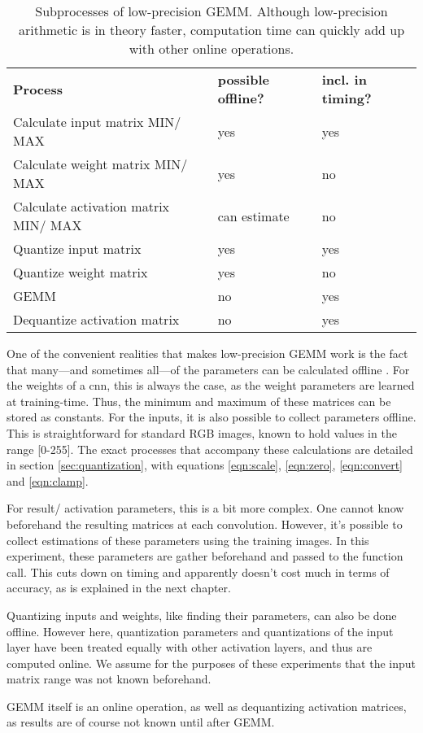 \begin{table}[]
\centering
\caption[Low-precision GEMM broken down by process]{Subprocesses of low-precision GEMM. Although low-precision arithmetic is in theory faster, computation time can quickly add up with other online operations.}
\label{tbl:gemmlowp}
\begin{tabular}{lll}
\textbf{Process}                                       & \textbf{possible offline?} & \textbf{incl. in timing?} \\
Calculate input matrix MIN/ MAX     & yes                        & yes                       \\
Calculate weight matrix MIN/ MAX     & yes                        & no                        \\
Calculate activation matrix MIN/ MAX & can estimate               & no                        \\
Quantize input matrix                & yes                        & yes                       \\
Quantize weight matrix               & yes                        & no                        \\
GEMM                                 & no                         & yes                       \\
Dequantize activation matrix         & no                         & yes                      
\end{tabular}
\end{table}

One of the convenient realities that makes low-precision GEMM work is the fact that many---and sometimes all---of the parameters can be calculated offline \cite{warden_quantize}. For the weights of a cnn, this is always the case, as the weight parameters are learned at training-time. Thus, the minimum and maximum of these matrices can be stored as constants. For the inputs, it is also possible to collect parameters offline. This is straightforward for standard RGB images, known to hold values in the range [0-255]. The exact processes that accompany these calculations are detailed in section \ref{sec:quantization}, with equations \ref{eqn:scale}, \ref{eqn:zero}, \ref{eqn:convert} and \ref{eqn:clamp}.

For result/ activation parameters, this is a bit more complex. One cannot know beforehand the resulting matrices at each convolution. However, it's possible to collect estimations of these parameters using the training images. In this experiment, these parameters are gather beforehand and passed to the function call. This cuts down on timing and apparently doesn't cost much in terms of accuracy, as is explained in the next chapter.

Quantizing inputs and weights, like finding their parameters, can also be done offline. However here, quantization parameters and quantizations of the input layer have been treated equally with other activation layers, and thus are computed online. We assume for the purposes of these experiments that the input matrix range was not known beforehand.

GEMM itself is an online operation, as well as dequantizing activation matrices, as results are of course not known until after GEMM.